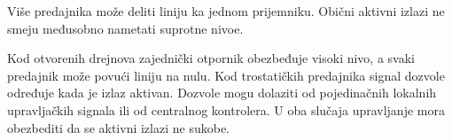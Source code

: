 Više predajnika može deliti liniju ka jednom prijemniku. Obični aktivni izlazi ne smeju međusobno nametati suprotne nivoe.

Kod otvorenih drejnova zajednički otpornik obezbeđuje visoki nivo, a svaki predajnik može povući liniju na nulu. Kod trostatičkih predajnika signal dozvole određuje kada je izlaz aktivan. Dozvole mogu dolaziti od pojedinačnih lokalnih upravljačkih signala ili od centralnog kontrolera. U oba slučaja upravljanje mora obezbediti da se aktivni izlazi ne sukobe.
